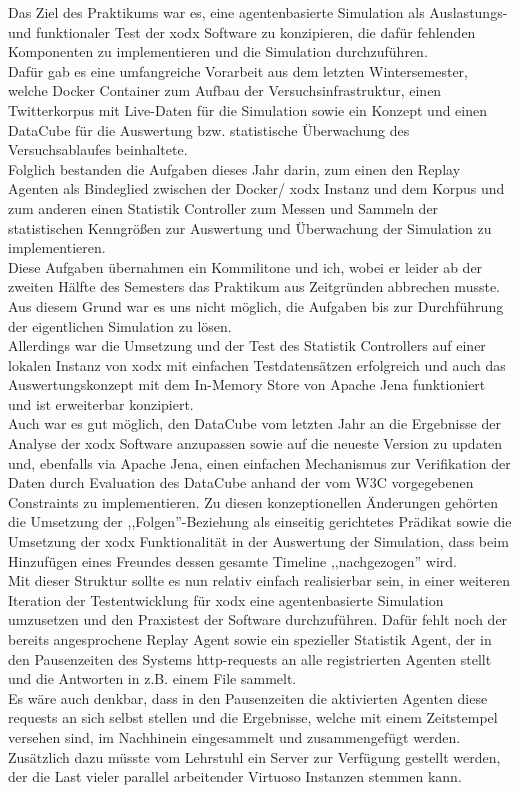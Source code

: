 \documentclass{article}
\begin{document}
Das Ziel des Praktikums war es, eine agentenbasierte Simulation als Auslastungs- und funktionaler Test der xodx Software zu konzipieren, die dafür fehlenden Komponenten zu implementieren und die Simulation durchzuführen.\\
Dafür gab es eine umfangreiche Vorarbeit aus dem letzten Wintersemester, welche Docker Container zum Aufbau der Versuchsinfrastruktur, einen Twitterkorpus mit Live-Daten für die Simulation sowie ein Konzept und einen DataCube für die Auswertung bzw. statistische Überwachung des Versuchsablaufes beinhaltete.\\
Folglich bestanden die Aufgaben dieses Jahr darin, zum einen den Replay Agenten als Bindeglied zwischen der Docker/ xodx Instanz und dem Korpus und zum anderen einen Statistik Controller zum Messen und Sammeln der statistischen Kenngrößen zur Auswertung und Überwachung der Simulation zu implementieren.\\
Diese Aufgaben übernahmen ein Kommilitone und ich, wobei er leider ab der zweiten Hälfte des Semesters das Praktikum aus Zeitgründen abbrechen musste. Aus diesem Grund war es uns nicht möglich, die Aufgaben bis zur Durchführung der eigentlichen Simulation zu lösen.\\
Allerdings war die Umsetzung und der Test des Statistik Controllers auf einer lokalen Instanz von xodx mit einfachen Testdatensätzen erfolgreich und auch das Auswertungskonzept mit dem In-Memory Store von Apache Jena funktioniert und ist erweiterbar konzipiert.\\
Auch war es gut möglich, den DataCube vom letzten Jahr an die Ergebnisse der Analyse der xodx Software anzupassen sowie auf die neueste Version zu updaten und, ebenfalls via Apache Jena, einen einfachen Mechanismus zur Verifikation der Daten durch Evaluation des DataCube anhand der vom W3C vorgegebenen Constraints zu implementieren. Zu diesen konzeptionellen Änderungen gehörten die Umsetzung der ,,Folgen''-Beziehung als einseitig gerichtetes Prädikat sowie die Umsetzung der xodx Funktionalität in der Auswertung der Simulation, dass beim Hinzufügen eines Freundes dessen gesamte Timeline ,,nachgezogen'' wird.\\
Mit dieser Struktur sollte es nun relativ einfach realisierbar sein, in einer weiteren Iteration der Testentwicklung für xodx eine agentenbasierte Simulation umzusetzen und den Praxistest der Software durchzuführen. Dafür fehlt noch der bereits angesprochene Replay Agent sowie ein spezieller Statistik Agent, der in den Pausenzeiten des Systems http-requests an alle registrierten Agenten stellt und die Antworten in z.B. einem File sammelt.\\
Es wäre auch denkbar, dass in den Pausenzeiten die aktivierten Agenten diese requests an sich selbst stellen und die Ergebnisse, welche mit einem Zeitstempel versehen sind, im Nachhinein eingesammelt und zusammengefügt werden.\\ 
Zusätzlich dazu müsste vom Lehrstuhl ein Server zur Verfügung gestellt werden, der die Last vieler parallel arbeitender Virtuoso Instanzen stemmen kann.

\newpage


\end{document}
